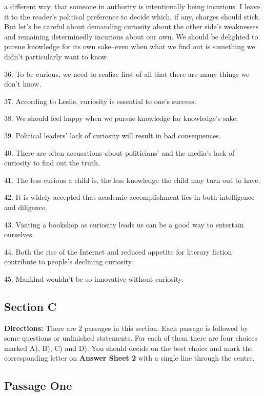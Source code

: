 \documentclass[UTF8,11pt]{ctexart}
\begin{document}
a different way, that someone in authority is intentionally being incurious. I leave it to the reader's political preference to decide which, if any, charges should stick. But let’s be careful about demanding curiosity about the other side’s weaknesses and remaining determinedly incurious about our own. We should be delighted to pursue knowledge for its own sake--even when what we find out is something we didn’t particularly want to know.


36. To be curious, we need to realize first of all that there are many things we don’t know.


37. According to Leslie, curiosity is essential to one’s success.


38. We should feel happy when we pursue knowledge for knowledge’s sake.


39. Political leaders’ lack of curiosity will result in bad consequences.


40. There are often accusations about politicians' and the media’s lack of curiosity to find out the truth.


41. The less curious a child is, the less knowledge the child may turn out to have.


42. It is widely accepted that academic accomplishment lies in both intelligence and diligence.


43. Visiting a bookshop as curiosity leads us can be a good way to entertain ourselves.


44. Both the rise of the Internet and reduced appetite for literary fiction contribute to people’s declining curiosity.


45. Mankind wouldn’t be so innovative without curiosity.


\subsection*{\textbf{Section C}}


\textbf{Directions:} There are 2 passages in this section. Each passage is followed by some questions or unfinished statements. For each of them there are four choices marked A), B), C) and D). You should decide on the best choice and mark the corresponding letter on\textbf{ Answer Sheet 2} with a single line through the centre.


\subsection*{\textbf{Passage One}}
\end{document}
